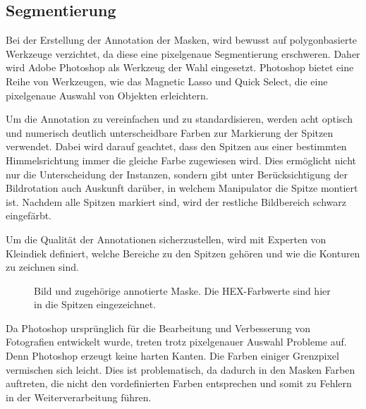 \subsection{Segmentierung}
Bei der Erstellung der Annotation der Masken, wird bewusst auf polygonbasierte Werkzeuge verzichtet, da diese eine pixelgenaue Segmentierung erschweren. Daher wird Adobe Photoshop \cite{adobephotoshop} als Werkzeug der Wahl eingesetzt. Photoshop bietet eine Reihe von Werkzeugen, wie das \glqq Magnetic Lasso\grqq{} und \glqq Quick Select\grqq{}, die eine pixelgenaue Auswahl von Objekten erleichtern.

Um die Annotation zu vereinfachen und zu standardisieren, werden acht optisch und numerisch deutlich unterscheidbare Farben zur Markierung der Spitzen verwendet. Dabei wird darauf geachtet, dass den Spitzen aus einer bestimmten Himmelsrichtung immer die gleiche Farbe zugewiesen wird. Dies ermöglicht nicht nur die Unterscheidung der Instanzen, sondern gibt unter Berücksichtigung der Bildrotation auch Auskunft darüber, in welchem Manipulator die Spitze montiert ist. Nachdem alle Spitzen markiert sind, wird der restliche Bildbereich schwarz eingefärbt.

Um die Qualität der Annotationen sicherzustellen, wird mit Experten von Kleindiek definiert, welche Bereiche zu den Spitzen gehören und wie die Konturen zu zeichnen sind.

\begin{figure}[htbp]
    \centering
    \caption{Bild und zugehörige annotierte Maske. Die HEX-Farbwerte sind hier in die Spitzen eingezeichnet.}
    \label{fig:mask}
\end{figure}
Da Photoshop ursprünglich für die Bearbeitung und Verbesserung von Fotografien entwickelt wurde, treten trotz pixelgenauer Auswahl Probleme auf. Denn Photoshop erzeugt keine harten Kanten. Die Farben einiger Grenzpixel vermischen sich leicht.
Dies ist problematisch, da dadurch in den Masken Farben auftreten, die nicht den vordefinierten Farben entsprechen und somit zu Fehlern in der Weiterverarbeitung führen.

